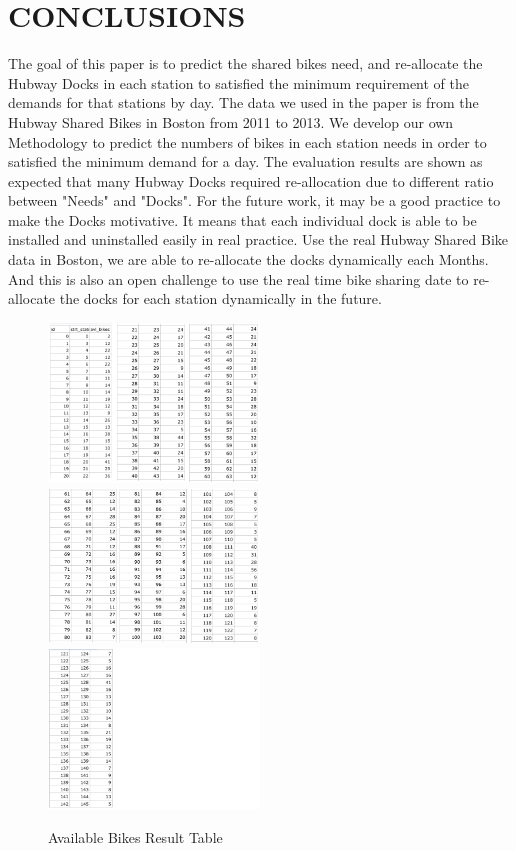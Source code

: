 \documentclass[journal, letterpaper]{IEEEtran}
\begin{document}
\section{CONCLUSIONS}
\large
The goal of this paper is to predict the shared bikes need, and re-allocate the Hubway Docks in each station to satisfied the minimum requirement of the demands for that stations by day. The data we used in the paper is from the Hubway Shared Bikes in Boston from 2011 to 2013.  We develop our own Methodology to predict the numbers of bikes in each station needs in order to satisfied the minimum demand for a day. The evaluation results are shown as expected that many Hubway Docks required re-allocation due to different ratio between "Needs" and "Docks". For the future work, it may be a good practice to make the Docks motivative. It means that each individual dock is able to be installed and uninstalled easily in real practice. Use the real Hubway Shared Bike data in Boston, we are able to re-allocate the docks dynamically each Months. And this is also an open challenge to use the real time bike sharing date to re-allocate the docks for each station dynamically in the future. 

\begin{figure}
  \includegraphics[width=0.5\textwidth]{all1.png}
  \includegraphics[width=0.5\textwidth]{all2.png}
  \includegraphics[width=0.5\textwidth]{all3.png}
  \caption{Available Bikes Result Table}
  \label{fig:1}
\end{figure}
\end{document}
